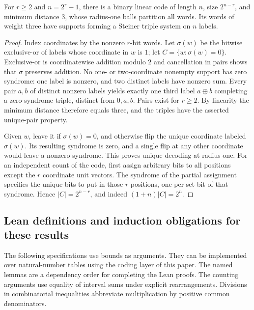 \begin{theorem}\label{result49}
For \(r\ge2\) and \(n=2^r-1\), there is a binary linear code of length
\(n\), size \(2^{n-r}\), and minimum distance \(3\), whose radius-one
balls partition all words. Its words of weight three have supports forming
a Steiner triple system on \(n\) labels.
\end{theorem}
\begin{proof}
Index coordinates by the nonzero \(r\)-bit words. Let \(\sigma(w)\)
be the bitwise exclusive-or of labels whose coordinate in \(w\) is \(1\);
let \(C=\{w:\sigma(w)=0\}\). Exclusive-or is coordinatewise addition
modulo \(2\) and cancellation in pairs shows that \(\sigma\) preserves
addition. No one- or two-coordinate nonempty support has zero syndrome:
one label is nonzero, and two distinct labels have nonzero sum. Every
pair \(a,b\) of distinct nonzero labels yields exactly one third
label \(a\mathbin{\oplus}b\) completing a zero-syndrome triple, distinct
from \(0,a,b\). Pairs exist for \(r\ge2\). By linearity the minimum
distance therefore equals three, and the triples have the asserted
unique-pair property.

Given \(w\), leave it if \(\sigma(w)=0\), and otherwise flip the unique
coordinate labeled \(\sigma(w)\). Its resulting syndrome is zero, and a
single flip at any other coordinate would leave a nonzero syndrome. This
proves unique decoding at radius one. For an independent count of the code,
first assign arbitrary bits to all positions except the \(r\) coordinate
unit vectors. The syndrome of the partial assignment specifies the unique
bits to put in those \(r\) positions, one per set bit of that syndrome.
Hence \(|C|=2^{n-r}\), and indeed \((1+n)|C|=2^n\).
\end{proof}

\subsection{Lean definitions and induction obligations for these results}

The following specifications use bounds as arguments. They can be
implemented over natural-number tables using the coding layer of this
paper. The named lemmas are a dependency order for completing the Lean
proofs. The counting arguments use equality of interval sums under
explicit rearrangements. Divisions in combinatorial inequalities abbreviate
multiplication by positive common denominators.


